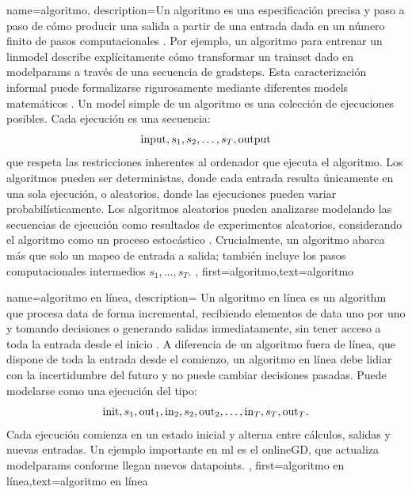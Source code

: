 {name={algoritmo},
  description={Un algoritmo es una especificación precisa y paso a paso de
    cómo producir una salida a partir de una entrada dada en un número finito de pasos computacionales \cite{Cormen:2022aa}. 
    Por ejemplo, un algoritmo para entrenar un \gls{linmodel} describe explícitamente cómo
	transformar un \gls{trainset} dado en \gls{modelparams} a través de una secuencia de \gls{gradstep}s. 
    Esta caracterización informal puede formalizarse rigurosamente mediante diferentes \gls{model}s matemáticos \cite{Sipser2013}. 
   	Un \gls{model} simple de un algoritmo es una colección de ejecuciones posibles. Cada ejecución es una secuencia:
    $${\rm input},s_1,s_2,\ldots,s_T,{\rm output}$$ 
    que respeta las restricciones inherentes al ordenador que ejecuta el algoritmo.
	Los algoritmos pueden ser deterministas, donde cada entrada resulta únicamente en una sola ejecución,
	o aleatorios, donde las ejecuciones pueden variar probabilísticamente. Los algoritmos aleatorios 
	pueden analizarse modelando las secuencias de ejecución como resultados de experimentos aleatorios, 
	considerando el algoritmo como un proceso estocástico \cite{RandomizedAlgos,BertsekasProb,Gallager13}.
	Crucialmente, un algoritmo abarca más que solo un mapeo de entrada a salida; también incluye 
	los pasos computacionales intermedios $s_1,\ldots,s_T$. 
	},
	first={algoritmo},text={algoritmo} 
}

{name=algoritmo en línea,
	description={
		Un algoritmo en línea es un \gls{algorithm} que procesa \gls{data} de forma incremental,
		recibiendo elementos de \gls{data} uno por uno y tomando decisiones o generando salidas inmediatamente, sin tener acceso a toda la entrada desde el inicio \cite{HazanOCO,PredictionLearningGames}.
		A diferencia de un algoritmo fuera de línea, que dispone de toda la entrada desde el comienzo, un algoritmo en línea debe lidiar con la incertidumbre del futuro y no puede cambiar decisiones pasadas.
		Puede modelarse como una ejecución del tipo:
		$${\rm init},s_1,{\rm out}_{1},{\rm in}_{2},s_2,{\rm out}_{2},\ldots,{\rm in}_{T},s_T,{\rm out}_{T}.$$
		Cada ejecución comienza en un estado inicial y alterna entre cálculos, salidas y nuevas entradas.
		Un ejemplo importante en \gls{ml} es el \gls{onlineGD}, que actualiza \gls{modelparams} conforme llegan nuevos \gls{datapoint}s.
	},
	first={algoritmo en línea},text={algoritmo en línea}
}



